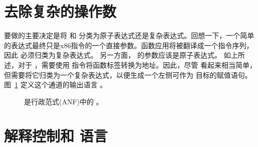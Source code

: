 \documentclass[11pt]{book}
\newcommand{\gray}[1]{{\color{gray} #1}}
\begin{document}
\section{去除复杂的操作数}
\label{sec:rco-r4}

要做的主要决定是将
 和  分类为原子表达式还是复杂表达式。回想一下，一个简单的表达式最终只是x86指令的一个直接参数。函数应用将被翻译成一个指令序列，因此
 必须归类为复杂表达式。
另一方面，  的参数应该是原子表达式。
%
如上所述，对于  ，需要使用  指令将函数标签转换为地址。因此，尽管  看起来相当简单，但需要将它归类为一个复杂表达式，以便生成一个左侧可作为
 目标的赋值语句。图~\ref{fig:Rfun-anf-syntax} 定义这个通道的输出语言 \LangFunANF{} 。

\begin{figure}[tp]
\centering
\fbox{
\begin{minipage}{0.96\textwidth}
\small
\[
\begin{array}{rcl}
  \Atm &::=& \gray{ \INT{\Int} \mid \VAR{\Var} \mid \BOOL{\itm{bool}} 
       \mid \VOID{} } \\
\Exp &::=& \gray{ \Atm \mid \READ{} } \\
   &\mid& \gray{ \NEG{\Atm} \mid \ADD{\Atm}{\Atm} } \\
   &\mid& \gray{ \LET{\Var}{\Exp}{\Exp} } \\
   &\mid& \gray{ \UNIOP{\key{'not}}{\Atm} } \\
   &\mid& \gray{ \BINOP{\itm{cmp}}{\Atm}{\Atm} \mid \IF{\Exp}{\Exp}{\Exp} }\\
   &\mid& \gray{ \LP\key{Collect}~\Int\RP \mid \LP\key{Allocate}~\Int~\Type\RP
  \mid \LP\key{GlobalValue}~\Var\RP }\\
   &\mid& \FUNREF{\Var} \mid \APPLY{\Atm}{\Atm\ldots}\\
 \Def &::=& \gray{ \FUNDEF{\Var}{([\Var \code{:} \Type]\ldots)}{\Type}{\code{'()}}{\Exp} }\\
R^{\dagger}_4  &::=& \gray{ \PROGRAMDEFS{\code{'()}}{\Def} }
\end{array}
\]
\end{minipage}
}
\caption{\LangFunANF{} 是行政范式(ANF)中的 \LangFun{} 。}
\label{fig:Rfun-anf-syntax}
\end{figure}


\section{解释控制和 \LangCFun{} 语言}
\label{sec:explicate-control-r4}
\end{document}
